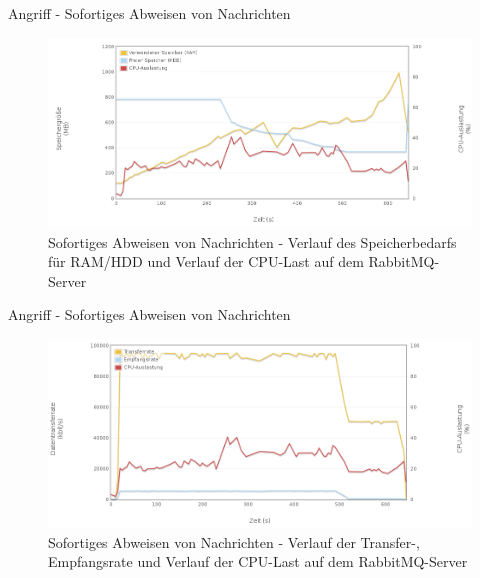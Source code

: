 \documentclass[10pt]{beamer}
\begin{document}
\begin{frame}{Angriff - Sofortiges Abweisen von Nachrichten}
\begin{figure}[!htb]
	\centering
	\includegraphics[width=\textwidth]{img/reject/reject_server1.png}
	\caption{\centering Sofortiges Abweisen von Nachrichten - Verlauf des Speicherbedarfs für RAM/HDD und Verlauf der CPU-Last auf dem RabbitMQ-Server}
	\label{fig:reject-server1}
\end{figure}
\end{frame}

\begin{frame}{Angriff - Sofortiges Abweisen von Nachrichten}		
\begin{figure}[!htb]
	\centering
	\includegraphics[width=\textwidth]{img/reject/reject_server2.png}
	\caption{\centering Sofortiges Abweisen von Nachrichten - Verlauf der Transfer-, Empfangsrate und Verlauf der CPU-Last auf dem RabbitMQ-Server}
	\label{fig:reject-server2}
\end{figure}
\end{frame}
\end{document}

